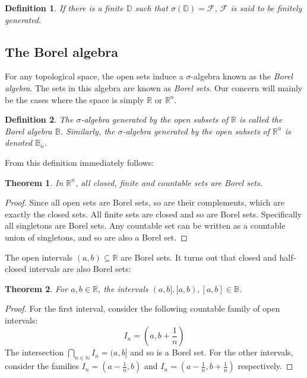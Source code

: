 \documentclass[12pt, a4paper]{article}
\newtheorem{theorem}{Theorem}[section]
\newtheorem{definition}{Definition}[section]
\numberwithin{equation}{section}
\begin{document}
\begin{definition}
If there is a finite $\mathbb{D}$ such that $\sigma(\mathbb{D})=\mathcal{F}$, $\mathcal{F}$ is said to be finitely generated.  
\end{definition}

\subsection{The Borel algebra}
For any topological space, the open sets induce a $\sigma$-algebra known as the \textit{Borel algebra}. The sets in this algebra are known as \textit{Borel sets}. Our concern will mainly be the cases where the space is simply $\mathbb{R}$ or $\mathbb{R}^n$.

\begin{definition}
The $\sigma$-algebra generated by the open subsets of $\mathbb{R}$ is called the Borel algebra $\mathbb{B}$. Similarly, the $\sigma$-algebra generated by the open subsets of $\mathbb{R}^n$ is denoted $\mathbb{B}_n$.
\end{definition}

From this definition immediately follows:

\begin{theorem}
In $\mathbb{R}^n$, all closed, finite and countable sets are Borel sets.
\end{theorem}
\begin{proof}
Since all open sets are Borel sets, so are their complements, which are exactly the closed sets. All finite sets are closed and so are Borel sets. Specifically all singletons are Borel sets. Any countable set can be written as a countable union of singletons, and so are also a Borel set.
\end{proof}

The open intervals $(a,b)\subseteq\mathbb{R}$ are Borel sets. It turns out that closed and half-closed intervals are also Borel sets:

\begin{theorem}
For $a,b\in\mathbb{R}$, the intervals $(a,b], [a,b), [a,b]\in\mathbb{B}$.
\end{theorem}
\begin{proof}
For the first interval, consider the following countable family of open intervals:
\begin{equation}
I_n=\left(a,b+\frac{1}{n}\right)
\end{equation}
The intersection $\bigcap_{n\in\mathbb{N}}I_n=(a,b]$ and so is a Borel set. For the other intervals, consider the families $I_n=\left(a-\frac{1}{n},b\right)$ and $I_n=\left(a-\frac{1}{n},b+\frac{1}{n}\right)$ respectively.
\end{proof}
\end{document}
